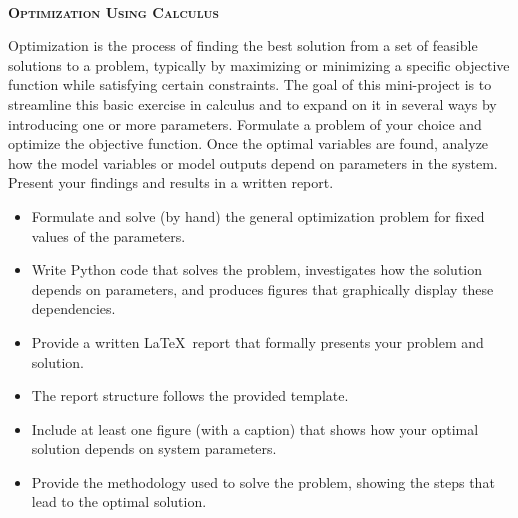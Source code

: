 \documentclass[article, 11pt]{article}
\begin{document}
\begin{center}
\\
\Huge{\textbf{\textsc{Optimization Using Calculus}}}
\end{center}

\vspace{.6cm}

\noindent {}

\vspace{-.35cm}
\noindent \hrulefill

Optimization is the process of finding the best solution from a set of feasible solutions to a problem, typically by maximizing or minimizing a specific objective function while satisfying certain constraints. The goal of this mini-project is to streamline this basic exercise in calculus and to expand on it in several ways by introducing one or more parameters. Formulate a problem of your choice and optimize the objective function. Once the optimal variables are found, analyze how the model variables or model outputs depend on parameters in the system. Present your findings and results in a written report. \\

\noindent {}

\vspace{-.35cm}
\noindent \hrulefill

\begin{itemize}
	\item Formulate and solve (by hand) the general optimization problem for fixed values of the parameters.
	\item Write Python code that solves the problem, investigates how the solution depends on parameters, and produces figures that graphically display these dependencies.
	\item Provide a written \LaTeX\, report that formally presents your problem and solution.
\end{itemize}

\noindent {}

\vspace{-.26cm}
\noindent \hrulefill

\begin{itemize}
	\item The report structure follows the provided template.
	\item Include at least one figure (with a caption) that shows how your optimal solution depends on system parameters.
	\item Provide the methodology used to solve the problem, showing the steps that lead to the optimal solution.
\end{itemize}
\end{document}
